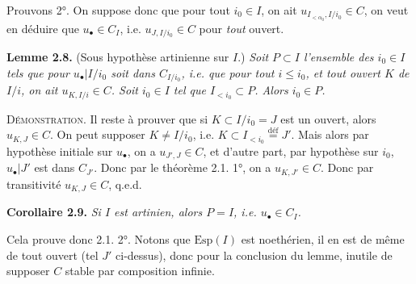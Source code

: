 
Prouvons 2°. On suppose donc que pour tout $i_0 \in I$, on ait $u_{I_{<\alpha_0},I/i_0} \in C$, on veut en déduire que $u_\bullet \in C_I$, i.e. $u_{J,I/i_0} \in C$ pour \textit{tout} ouvert.

\noindent\textbf{Lemme 2.8.} (Sous hypothèse artinienne sur $I$.) \textit{Soit $P \subset I$ l'ensemble des $i_0 \in I$ tels que pour $u_\bullet|I/i_0$ soit dans $C_{I/i_0}$, i.e. que pour tout $i \leq i_0$, et tout ouvert $K$ de $I/i$, on ait $u_{K,I/i} \in C$. Soit $i_0 \in I$ tel que $I_{<i_0} \subset P$. Alors $i_0 \in P$.}

\noindent\textsc{Démonstration}. Il reste à prouver que si $K \subset I/i_0 = J$ est un ouvert, alors $u_{K,J} \in C$. On peut supposer $K \neq I/i_0$, i.e. $K \subset I_{<i_0} \overset{\text{déf}}{=} J'$. Mais alors par hypothèse initiale sur $u_\bullet$, on a $u_{J',J} \in C$, et d'autre part, par hypothèse sur $i_0$, $u_\bullet|J'$ est dans $C_{J'}$. Donc par le théorème 2.1. 1°, on a $u_{K,J'} \in C$. Donc par transitivité $u_{K,J} \in C$, q.e.d.

\noindent\textbf{Corollaire 2.9.} \textit{Si $I$ est artinien, alors $P = I$, i.e. $u_\bullet \in C_I$.}

Cela prouve donc 2.1. 2°. Notons que $\mathrm{Esp}(I)$ est noethérien, il en est de même de tout ouvert (tel $J'$ ci-dessus), donc  pour la conclusion du lemme, inutile de supposer $C$ stable par composition infinie.

